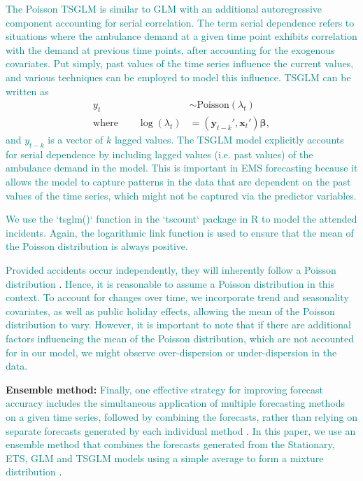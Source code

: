 \documentclass[
  authoryear,
  preprint,
  3p]{elsarticle}
\begin{document}
\textcolor{teal}{The Poisson TSGLM is similar to GLM with an additional autoregressive component accounting for serial correlation. The term serial dependence refers to situations where the ambulance demand at a given time point exhibits correlation with the demand at previous time points, after accounting for the exogenous covariates. Put simply, past values of the time series influence the current values, and various techniques can be employed to model this influence. TSGLM can be written as}
\begin{align*}
  y_t &\sim \text{Poisson}(\lambda_t) \\
  \text{where}\qquad
  \log(\lambda_t) &= (\bm{y}_{t-k}' , \bm{x}_t')\bm{\beta},
\end{align*}
\textcolor{teal}{and ${y}_{t-k}$ is a vector of $k$ lagged values. The TSGLM model explicitly accounts for serial dependence by including lagged values (i.e. past values) of the ambulance demand in the model. This is important in EMS forecasting because it allows the model to capture patterns in the data that are dependent on the past values of the time series, which might not be captured via the predictor variables.}

\textcolor{teal}{We use the `tsglm()` function in the `tscount` package in R}
\citep{JSSv082i05}
\textcolor{teal}{to model the attended incidents. Again, the logarithmic link function is used to ensure that the mean of the Poisson distribution is always positive.}

\textcolor{teal}{Provided accidents occur independently, they will inherently follow a Poisson distribution}
\citep[p156--158]{feller1991introduction}.
\textcolor{teal}{Hence, it is reasonable to assume a Poisson distribution in this context. To account for changes over time, we incorporate trend and seasonality covariates, as well as public holiday effects, allowing the mean of the Poisson distribution to vary. However, it is important to note that if there are additional factors influencing the mean of the Poisson distribution, which are not accounted for in our model, we might observe over-dispersion or under-dispersion in the data.}

\textbf{Ensemble method:}
\textcolor{teal}{Finally, one effective strategy for improving forecast accuracy includes the simultaneous application of multiple forecasting methods on a given time series, followed by combining the forecasts, rather than relying on separate forecasts generated by each individual method}
\citep{clemen1989combining}.
\textcolor{teal}{In this paper, we use an ensemble method that combines the forecasts generated from the Stationary, ETS, GLM and TSGLM models using a simple average to form a mixture distribution}
\citep{combinations}.
\end{document}
